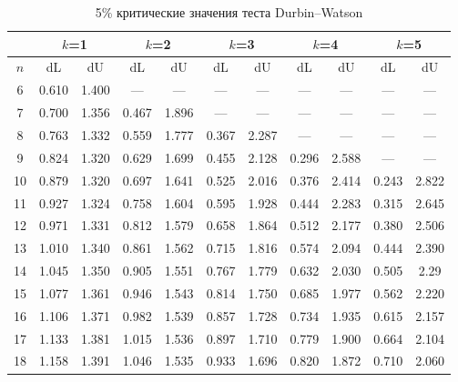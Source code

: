 \documentclass[12pt]{article}
\begin{document}
\begin{table}
\caption{5\% критические значения теста Durbin--Watson}
\begin{center}
{\footnotesize
\begin{tabular}{|c|c|c|c|c|c|c|c|c|c|c|}
  \hline

 & \multicolumn{2}{c|}{$k$=1}& \multicolumn{2}{c|}{$k$=2}& \multicolumn{2}{c|}{$k$=3}
 & \multicolumn{2}{c|}{$k$=4} & \multicolumn{2}{c|}{$k$=5} \\ \hline

$n$ &dL& dU& dL &dU &dL& dU& dL& dU& dL& dU\\ \hline


6&0.610&1.400&---&---&---&---&---&---&---&---\\


7 &0.700&1.356&0.467&1.896&---&---&
---&---&---&---\\


8&0.763&1.332&0.559&1.777&0.367&2.287&---&---&
---&---\\


9&0.824&1.320&0.629&1.699&0.455&2.128&0.296&2.588&---&---\\

10&0.879&
1.320&0.697&1.641&0.525&2.016&0.376&2.414&0.243&2.822\\


11&0.927&1.324&0.758&
1.604&0.595&1.928&0.444&2.283&0.315&2.645\\

12&0.971&1.331&0.812&1.579&0.658&
1.864&0.512&2.177&0.380&2.506\\

13&1.010&1.340&0.861&1.562&0.715&1.816&0.574&
2.094&0.444&2.390\\


14&1.045&1.350&0.905&1.551&0.767&1.779&0.632&2.030&0.505&
2.29\\


15&1.077&1.361&0.946&1.543&0.814&1.750&0.685&1.977&0.562&2.220\\

16&1.106&1.371&
0.982&1.539&0.857&1.728&0.734&1.935&0.615&2.157\\


17&1.133&1.381&1.015&1.536&
0.897&1.710&0.779&1.900&0.664&2.104\\


18&1.158&1.391&1.046&1.535&0.933&1.696&
0.820&1.872&0.710&2.060\\



\end{tabular}}
\end{center}
\end{table}
\end{document}
